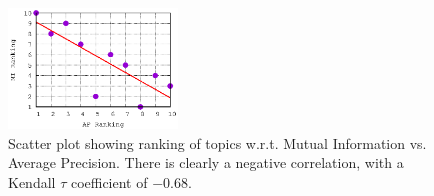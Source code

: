 \begin{figure}[t!]
\centering
\includegraphics[width=0.4\textwidth]{images/ap_mi_correlation_ranking}
\caption{Scatter plot showing ranking of topics w.r.t. Mutual Information vs. Average Precision. There is clearly a negative correlation, with a Kendall $\tau$ coefficient of $-0.68$.}
\label{fig:ap_mi_correlation_ranking}
\end{figure}


